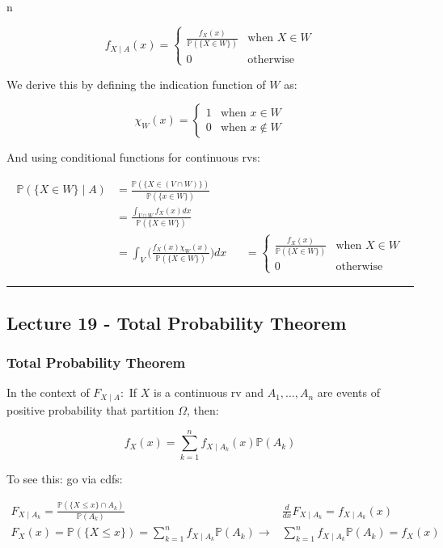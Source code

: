 n\documentclass{article}
\begin{document}
\[
  f_{X\mid A}(x) =
  \begin{cases}
    \frac{f_X(x)} {\mathbb{P}(\{X\in W\})} & \text{when } X\in W \\
    0 & \text{otherwise}
  \end{cases}
\]

We derive this by defining the indication function of $W$ as:

\[
  \chi_W(x) =
  \begin{cases}
    1 & \text{when } x\in W \\
    0 & \text{when } x\not\in W
  \end{cases}
\]

And using conditional functions for continuous rvs:

\[
  \begin{aligned}
    \mathbb{P}(\{X\in W\}\mid A)
    &= \frac{\mathbb{P}(\{X\in (V\cap W)\})} {\mathbb{P}(\{x\in W\})} \\
    &= \frac{\int_{V\cap W}f_X(x)dx} {\mathbb{P}(\{X\in W\})} \\
    &= \int_V\bigg(\frac{f_X(x)\chi_W(x)} {\mathbb{P}(\{X\in W\})}\bigg) dx
    &&= \begin{cases}
      \frac{f_X(x)} {\mathbb{P}(\{X\in W\})} & \text{when } X\in W \\
      0 & \text{otherwise}
    \end{cases}
  \end{aligned}
\]


\medskip\hrule
\subsection{Lecture 19 - Total Probability Theorem}

\subsubsection{Total Probability Theorem}

In the context of $F_{X \mid A}:$ If $X$ is a continuous rv and $A_1,
\dots, A_n$ are events of positive probability that partition
$\Omega$, then:

\begin{equation}
  \tag{Total Probability Theorem}
  \boxed{
    f_X(x) = \sum_{k=1}^n f_{X\mid A_k}(x) \mathbb{P}(A_k)
  }
\end{equation}

To see this: go via cdfs:

\[
  \begin{aligned}
    F_{X\mid A_k} = \frac{\mathbb{P}(\{X\leq x\} \cap A_k)}
    {\mathbb{P}(A_k)}
    & \frac{d}{dx} F_{X\mid A_k} = f_{X\mid A_k}(x) \\
    F_X(x) = \mathbb{P}(\{X\leq x\}) = \sum_{k=1}^n f_{X\mid
      A_k}\mathbb{P}(A_k) \rightarrow
    & \sum_{k=1}^n f_{X\mid A_k} \mathbb{P}(A_k) = f_X(x)
  \end{aligned}
\]
\end{document}
